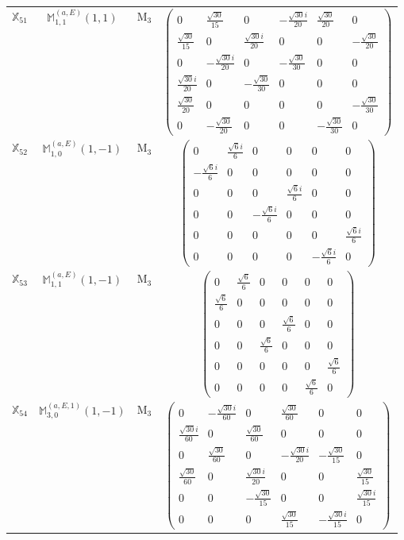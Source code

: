 \documentclass[fleqn,10pt,landscape]{article}
\begin{document}
\begin{itemize}
\begin{center}
\begin{longtable}{c|c|c|c}
$ \mathbb{X}_{51} $ & $\mathbb{M}_{1,1}^{(a,E)}(1,1)$ & M$_{3}$ & $\begin{pmatrix} 0 & \frac{\sqrt{30}}{15} & 0 & - \frac{\sqrt{30} i}{20} & \frac{\sqrt{30}}{20} & 0 \\ \frac{\sqrt{30}}{15} & 0 & \frac{\sqrt{30} i}{20} & 0 & 0 & - \frac{\sqrt{30}}{20} \\ 0 & - \frac{\sqrt{30} i}{20} & 0 & - \frac{\sqrt{30}}{30} & 0 & 0 \\ \frac{\sqrt{30} i}{20} & 0 & - \frac{\sqrt{30}}{30} & 0 & 0 & 0 \\ \frac{\sqrt{30}}{20} & 0 & 0 & 0 & 0 & - \frac{\sqrt{30}}{30} \\ 0 & - \frac{\sqrt{30}}{20} & 0 & 0 & - \frac{\sqrt{30}}{30} & 0 \end{pmatrix}$ \\
$ \mathbb{X}_{52} $ & $\mathbb{M}_{1,0}^{(a,E)}(1,-1)$ & M$_{3}$ & $\begin{pmatrix} 0 & \frac{\sqrt{6} i}{6} & 0 & 0 & 0 & 0 \\ - \frac{\sqrt{6} i}{6} & 0 & 0 & 0 & 0 & 0 \\ 0 & 0 & 0 & \frac{\sqrt{6} i}{6} & 0 & 0 \\ 0 & 0 & - \frac{\sqrt{6} i}{6} & 0 & 0 & 0 \\ 0 & 0 & 0 & 0 & 0 & \frac{\sqrt{6} i}{6} \\ 0 & 0 & 0 & 0 & - \frac{\sqrt{6} i}{6} & 0 \end{pmatrix}$ \\
$ \mathbb{X}_{53} $ & $\mathbb{M}_{1,1}^{(a,E)}(1,-1)$ & M$_{3}$ & $\begin{pmatrix} 0 & \frac{\sqrt{6}}{6} & 0 & 0 & 0 & 0 \\ \frac{\sqrt{6}}{6} & 0 & 0 & 0 & 0 & 0 \\ 0 & 0 & 0 & \frac{\sqrt{6}}{6} & 0 & 0 \\ 0 & 0 & \frac{\sqrt{6}}{6} & 0 & 0 & 0 \\ 0 & 0 & 0 & 0 & 0 & \frac{\sqrt{6}}{6} \\ 0 & 0 & 0 & 0 & \frac{\sqrt{6}}{6} & 0 \end{pmatrix}$ \\
$ \mathbb{X}_{54} $ & $\mathbb{M}_{3,0}^{(a,E,1)}(1,-1)$ & M$_{3}$ & $\begin{pmatrix} 0 & - \frac{\sqrt{30} i}{60} & 0 & \frac{\sqrt{30}}{60} & 0 & 0 \\ \frac{\sqrt{30} i}{60} & 0 & \frac{\sqrt{30}}{60} & 0 & 0 & 0 \\ 0 & \frac{\sqrt{30}}{60} & 0 & - \frac{\sqrt{30} i}{20} & - \frac{\sqrt{30}}{15} & 0 \\ \frac{\sqrt{30}}{60} & 0 & \frac{\sqrt{30} i}{20} & 0 & 0 & \frac{\sqrt{30}}{15} \\ 0 & 0 & - \frac{\sqrt{30}}{15} & 0 & 0 & \frac{\sqrt{30} i}{15} \\ 0 & 0 & 0 & \frac{\sqrt{30}}{15} & - \frac{\sqrt{30} i}{15} & 0 \end{pmatrix}$ \\

\end{longtable}
\end{center}
\end{itemize}
\end{document}
